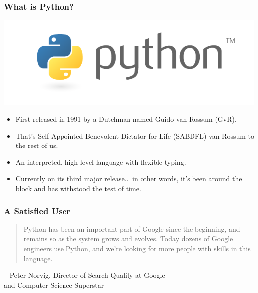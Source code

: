 \documentclass[10pt]{beamer}
\begin{document}
\begin{frame}
  \frametitle{What is Python?}
  \centering
  \includegraphics[scale=0.5]{PythonLogo.png} \\
  \begin{itemize}
    \item First released in 1991 by a Dutchman named Guido van Rossum (GvR).
    \item That's Self-Appointed Benevolent Dictator for Life (SABDFL) van Rossum to the rest of us.
    \item An interpreted, high-level language with flexible typing.
    \item Currently on its third major release... in other words, it's been around the block and has withstood the test of time.
  \end{itemize}
\end{frame}

\begin{frame}
  \frametitle{A Satisfied User}
  \begin{quote}
      Python has been an important part of Google since the beginning, and remains so as the system grows and evolves. Today dozens of Google engineers use Python, and we're looking for more people with skills in this language.
  \end{quote}
  \begin{flushright}
    \footnotesize
    -- Peter Norvig, Director of Search Quality at Google \\ and Computer Science Superstar
  \end{flushright}
\end{frame}
\end{document}
